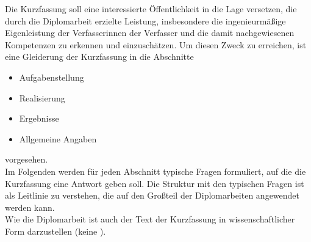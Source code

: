 \renewcommand*{\authorOfNextLines}{HTL Weiz}
\label{par:KurzfassungDiplomarbeitErlaeuterung}
Die Kurzfassung soll eine interessierte Öffentlichkeit in die Lage versetzen, die durch die Diplomarbeit erzielte Leistung, 
 insbesondere die ingenieurmäßige Eigenleistung der Verfasserinnen \bzw der Verfasser und die damit nachgewiesenen Kompetenzen zu erkennen und einzuschätzen. 
Um diesen Zweck zu erreichen, ist eine Gleiderung der Kurzfassung in die Abschnitte
\begin{itemize}
	\item Aufgabenstellung
	\item Realisierung
	\item Ergebnisse
	\item Allgemeine Angaben
\end{itemize} 
vorgesehen.\\
Im Folgenden werden für jeden Abschnitt typische Fragen formuliert, auf die die Kurzfassung eine Antwort geben soll. 
Die Struktur mit den typischen Fragen ist als Leitlinie zu verstehen, die auf den Großteil der Diplomarbeiten angewendet werden kann.\\
Wie die Diplomarbeit ist auch der Text der Kurzfassung in wissenschaftlicher Form darzustellen (keine ).

